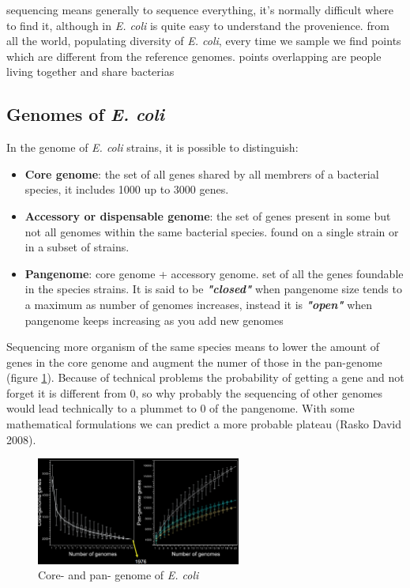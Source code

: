 sequencing means generally to sequence everything, it's normally difficult where to find it, although in \emph{\emph{E. coli}} is quite easy to understand the provenience.
from all the world, populating diversity of \emph{\emph{E. coli}}, every time we sample we find points which are different from the reference genomes.
points overlapping are people living together and share bacterias


\subsection{Genomes of \emph{E. coli}}

In the genome of \emph{E. coli} strains, it is possible to distinguish:

\begin{itemize}
    \item \textbf{Core genome}: the set of all genes shared by all membrers of a bacterial species, it includes 1000 up to 3000 genes.
    \item \textbf{Accessory or dispensable genome}: the set of genes present in some but not all genomes within the same bacterial species. found on a single strain or in a subset of strains. 
    \item \textbf{Pangenome}: core genome + accessory genome. set of all the genes foundable in the species strains. It is said to be \textit{\textbf{"closed"}} when pangenome size tends to a maximum as number of genomes increases, instead it is \textit{\textbf{"open"}} when pangenome keeps increasing as you add new genomes
\end{itemize}


Sequencing more organism of the same species means to lower the amount of genes in the core genome and augment the numer of those in the pan-genome (figure \ref{corepangenome}). 
Because of technical problems the probability of getting a gene and not forget it is different from 0, so why probably the sequencing of other genomes would lead technically to a plummet to 0 of the pangenome. With some mathematical formulations we can predict a more probable plateau (Rasko David 2008). 

\begin{figure}[h]
\caption{Core- and pan- genome of \emph{E. coli}}\label{corepangenome}
\centering
\includegraphics[width=0.6\textwidth]{EcoliCorePanGenome}
\end{figure}


